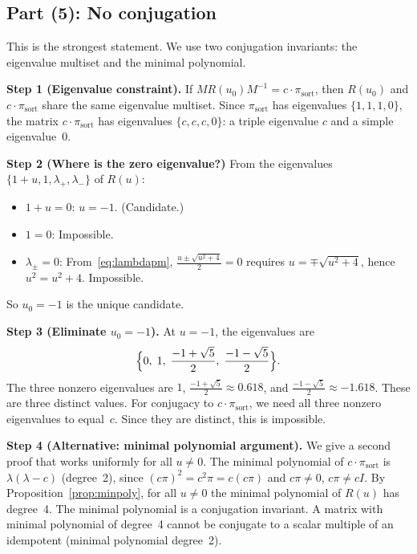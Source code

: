 \documentclass[11pt]{article}
\theoremstyle{remark}
\newcommand{\pisort}{\pi_{\mathrm{sort}}}
\begin{document}
\subsection{Part (5): No conjugation}

This is the strongest statement. We use two conjugation invariants: the
eigenvalue multiset and the minimal polynomial.

\textbf{Step 1 (Eigenvalue constraint).}
If $M R(u_0) M^{-1} = c \cdot \pisort$, then $R(u_0)$ and
$c \cdot \pisort$ share the same eigenvalue multiset. Since $\pisort$
has eigenvalues $\{1,1,1,0\}$, the matrix $c \cdot \pisort$ has
eigenvalues $\{c,c,c,0\}$: a triple eigenvalue $c$ and a simple
eigenvalue~$0$.

\textbf{Step 2 (Where is the zero eigenvalue?)}
From the eigenvalues $\{1+u, 1, \lambda_+, \lambda_-\}$ of $R(u)$:
\begin{itemize}
  \item $1+u = 0$: $u = -1$. (Candidate.)
  \item $1 = 0$: Impossible.
  \item $\lambda_\pm = 0$: From~\eqref{eq:lambdapm},
    $\frac{u \pm \sqrt{u^2+4}}{2} = 0$ requires
    $u = \mp\sqrt{u^2+4}$, hence $u^2 = u^2+4$. Impossible.
\end{itemize}
So $u_0 = -1$ is the unique candidate.

\textbf{Step 3 (Eliminate $u_0 = -1$).}
At $u = -1$, the eigenvalues are
\begin{equation}\label{eq:evu-1}
  \Bigl\{0,\; 1,\; \frac{-1+\sqrt{5}}{2},\;
  \frac{-1-\sqrt{5}}{2}\Bigr\}.
\end{equation}
The three nonzero eigenvalues are $1$,
$\frac{-1+\sqrt{5}}{2} \approx 0.618$, and
$\frac{-1-\sqrt{5}}{2} \approx -1.618$. These are three distinct
values. For conjugacy to $c \cdot \pisort$, we need all three nonzero
eigenvalues to equal~$c$. Since they are distinct, this is impossible.

\textbf{Step 4 (Alternative: minimal polynomial argument).}
We give a second proof that works uniformly for all $u \neq 0$.
The minimal polynomial of $c \cdot \pisort$ is $\lambda(\lambda - c)$
(degree~2), since $(c\pi)^2 = c^2\pi = c(c\pi)$ and $c\pi \neq 0$,
$c\pi \neq cI$.
By Proposition~\ref{prop:minpoly}, for all $u \neq 0$ the minimal
polynomial of $R(u)$ has degree~4. The minimal polynomial is a
conjugation invariant. A matrix with minimal polynomial of degree~4
cannot be conjugate to a scalar multiple of an idempotent (minimal
polynomial degree~2).
\end{document}
